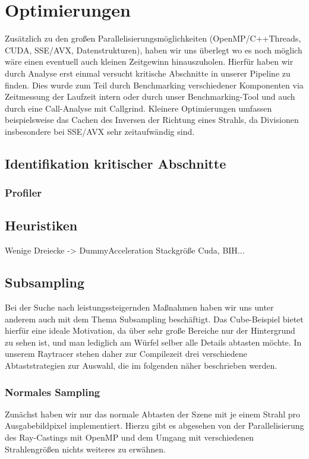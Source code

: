 \section{Optimierungen}
Zusätzlich zu den großen Parallelisierungsmöglichkeiten (OpenMP/C++Threads, CUDA, SSE/AVX, Datenstrukturen), haben wir uns überlegt wo es noch möglich wäre einen eventuell auch kleinen Zeitgewinn hinauszuholen.
Hierfür haben wir durch Analyse erst einmal versucht kritische Abschnitte in unserer Pipeline zu finden.
Dies wurde zum Teil durch Benchmarking verschiedener Komponenten via Zeitmessung der Laufzeit intern oder durch unser Benchmarking-Tool und auch durch eine Call-Analyse mit Callgrind.
Kleinere Optimierungen umfassen beispielsweise das Cachen des Inversen der Richtung eines Strahls, da Divisionen insbesondere bei SSE/AVX sehr zeitaufwändig sind.

\subsection{Identifikation kritischer Abschnitte}
\subsubsection{Profiler}

\subsection{Heuristiken}
Wenige Dreiecke -> DummyAcceleration
Stackgröße Cuda, BIH...

\subsection{Subsampling}
Bei der Suche nach leistungssteigernden Maßnahmen haben wir uns unter anderem auch mit dem Thema Subsampling beschäftigt.
Das Cube-Beispiel bietet hierfür eine ideale Motivation, da über sehr große Bereiche nur der Hintergrund zu sehen ist, und man lediglich am Würfel selber alle Details abtasten möchte.
In unserem Raytracer stehen daher zur Compilezeit drei verschiedene Abtaststrategien zur Auswahl, die im folgenden näher beschrieben werden.

\subsubsection{Normales Sampling}
Zunächst haben wir nur das normale Abtasten der Szene mit je einem Strahl pro Ausgabebildpixel implementiert.
Hierzu gibt es abgesehen von der Parallelisierung des Ray-Castings mit OpenMP und dem Umgang mit verschiedenen Strahlengrößen nichts weiteres zu erwähnen.

